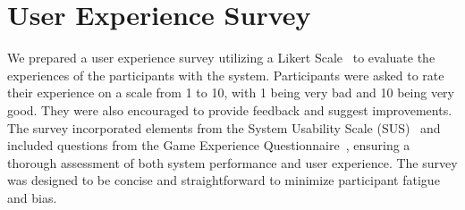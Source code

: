 \section{User Experience Survey}
We prepared a user experience survey utilizing a Likert Scale~\cite{likert1932technique} to evaluate the experiences of the participants with the system. 
Participants were asked to rate their experience on a scale from 1 to 10, with 1 being very bad and 10 being very good. 
They were also encouraged to provide feedback and suggest improvements. 
The survey incorporated elements from the System Usability Scale (SUS)~\cite{brooke1996sus} and included questions from the Game Experience Questionnaire~\cite{ijsselsteijn2013game}, ensuring a thorough assessment of both system performance and user experience. 
The survey was designed to be concise and straightforward to minimize participant fatigue and bias.

